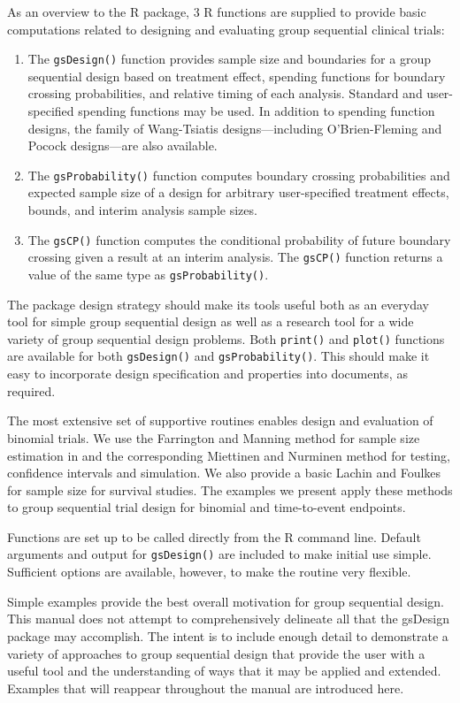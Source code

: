 As an overview to the R package, 3 R functions are supplied to provide basic computations related to designing and evaluating group sequential clinical trials:

\begin{enumerate}
\item The \texttt{gsDesign()} function provides sample size and
boundaries for a group sequential design based on treatment effect, spending
functions for boundary crossing probabilities, and relative timing of each
analysis. Standard and user-specified spending functions may be used. In
addition to spending function designs, the family of Wang-Tsiatis
designs---including O'Brien-Fleming and Pocock designs---are also available.

\item The \texttt{gsProbability()} function computes boundary crossing 
probabilities and expected sample size of a design for arbitrary 
user-specified treatment effects, bounds, and interim analysis sample sizes.

\item The \texttt{gsCP()} function computes the conditional probability of 
future boundary crossing given a result at an interim analysis. 
The \texttt{gsCP()} function returns a value of the same type as 
\texttt{gsProbability()}.
\end{enumerate}

The package design strategy should make its tools useful both as an
everyday tool for simple group sequential design as well as a research tool
for a wide variety of group sequential design problems. Both \texttt{print()}
and \texttt{plot()} functions are available for both \texttt{gsDesign()} and
\texttt{gsProbability()}. This should make it easy to incorporate design
specification and properties into documents, as required.

The most extensive set of supportive routines enables design and evaluation of binomial trials.
We use the Farrington and Manning \cite{FarringtonManning} method for sample size estimation in  and the corresponding Miettinen and Nurminen \cite{MandN} method for testing, confidence intervals and simulation. We also provide a basic Lachin and Foulkes \cite{LachinFoulkes} for sample size for survival studies. 
The examples we present apply these methods to group sequential trial design for binomial and time-to-event endpoints.

Functions are set up to be called directly from the R command line. Default
arguments and output for \texttt{gsDesign()} are included to make initial use
simple. Sufficient options are available, however, to make the routine very
flexible. 

Simple examples provide the best overall motivation for group sequential design. This manual does not attempt to comprehensively delineate all that the gsDesign package may accomplish. 
The intent is to include enough detail to demonstrate a variety of approaches to group sequential design that provide the user with a useful tool and the understanding of ways that it may be applied and extended. 
Examples that will reappear throughout the manual are introduced here.
